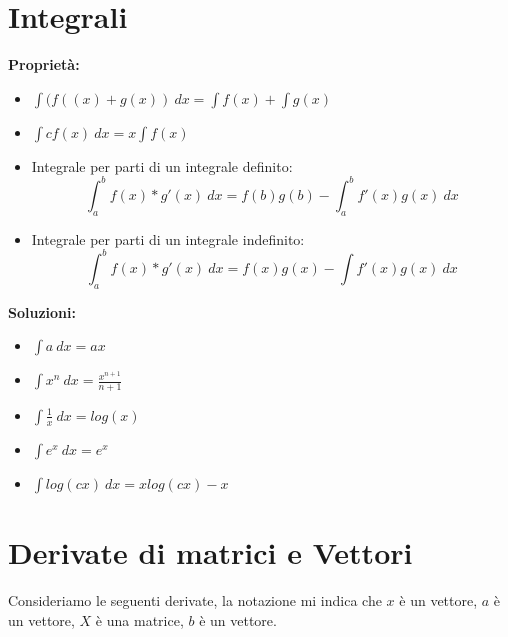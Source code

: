 \documentclass[14pt]{extreport}
\begin{document}
\section{Integrali}

\textbf{Proprietà:}

\begin{itemize}
\item $\int (f((x)+g(x)) \ dx = \int f(x) + \int g(x)$
\item $\int cf(x) \ dx =x\int f(x)$
\item Integrale per parti di un integrale definito: \\
$$\int_a^b f(x)*g'(x) \ dx = f(b)g(b) - \int_a^bf'(x)g(x) \ dx$$
\item Integrale per parti di un integrale indefinito: $$\int_a^b f(x)*g'(x) \ dx = f(x)g(x) - \int f'(x)g(x) \ dx$$
\end{itemize}


\textbf{Soluzioni:}

\begin{itemize}
\item $\int a \ dx =ax$
\item $\int x^n \ dx= \frac{x^{n+1}}{n+1}$
\item $\int \frac{1}{x} \ dx= log(x)$
\item $\int e^x\ dx= e^x$
\item $\int log(cx)\ dx= xlog(cx) - x$
\end{itemize}

\section{Derivate di matrici e Vettori}

Consideriamo le seguenti derivate, la notazione mi indica che $x$ è un vettore, $a$ è un vettore, $X$ è una matrice, $b$ è un vettore.
\end{document}
